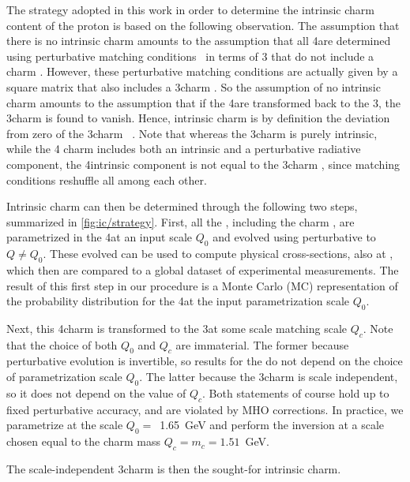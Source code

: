 
The strategy adopted in this work in order to
determine the intrinsic charm content of the proton is 
based on the following
observation.
%
The assumption that there is no intrinsic charm
amounts to the assumption
that all 4\fns \pdfs are determined~\cite{Collins:1986mp} using
perturbative matching conditions~\cite{pdfnnlo} in terms of 
3\fns \pdfs
that do not include
a charm \pdf.
%
However, these perturbative matching conditions are
actually given by a square matrix that also includes a 3\fns charm
\pdf.
%
So the assumption of no intrinsic charm amounts to the assumption
that if the 4\fns \pdfs are transformed back to the 3\fns, the 3\fns charm
\pdf is found to vanish. Hence, intrinsic charm is by definition the
deviation from zero of the 3\fns charm \pdf~\cite{Ball:2015dpa}. Note
that whereas the 3\fns charm \pdf is purely intrinsic, while the 4\fns
charm \pdf includes both an intrinsic and a perturbative
 radiative component, the
4\fns intrinsic component is not equal to the 3\fns charm \pdf, since
matching conditions reshuffle all \pdfs among each other. 

Intrinsic charm can then be determined through the following two steps,
summarized in \cref{fig:ic/strategy}. 
First, all the \pdfs, including the charm \pdf, are parametrized 
in the 4\fns at an input scale $Q_0$ and evolved 
using \nnlo perturbative \qcd to   $Q \not = Q_0$.
%
These evolved \pdfs can be used to 
compute physical cross-sections, also at \nnlo, which then are
compared to a global dataset of experimental measurements.
%
The result of this first step in our procedure is 
a Monte Carlo (MC) representation
of the probability distribution for the 4\fns \pdfs at the input
parametrization scale $Q_0$.

Next, this 4\fns charm \pdf is transformed to the 3\fns at some scale matching scale
$Q_c$.
%
Note that the choice of both $Q_0$ and $Q_c$ are immaterial. The former
because perturbative evolution is invertible, so
results for the \pdfs do not depend on the choice of
parametrization scale $Q_0$. The latter because 
the 3\fns charm is scale independent, so it does not depend on the
value of $Q_c$.
Both statements of course hold up to fixed perturbative accuracy, and
are violated by MHO corrections.
%
In practice, we parametrize \pdfs at the scale
$Q_0=$~1.65~GeV and perform the inversion at a scale
chosen equal to the charm mass $Q_c=m_c=1.51$~GeV.

The scale-independent 3\fns charm \pdf is then the sought-for intrinsic
charm.

